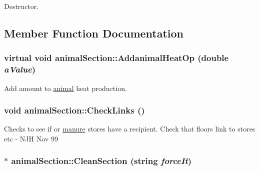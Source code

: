 Destructor. 

\subsection{Member Function Documentation}
\hypertarget{classanimal_section_a725e52db97d2127b775e259cc21e954e}{
\subsubsection[{AddanimalHeatOp}]{\setlength{\rightskip}{0pt plus 5cm}virtual void animalSection::AddanimalHeatOp (double {\em aValue})}}
\label{classanimal_section_a725e52db97d2127b775e259cc21e954e}


Add amount to \hyperlink{classanimal}{animal} heat production. \hypertarget{classanimal_section_a4d179a53e1e930f22e3038edbc8087df}{
\subsubsection[{CheckLinks}]{\setlength{\rightskip}{0pt plus 5cm}void animalSection::CheckLinks ()}}
\label{classanimal_section_a4d179a53e1e930f22e3038edbc8087df}


Checks to see if or \hyperlink{classmanure}{manure} stores have a recipient. Check that floors link to stores etc -\/ NJH Nov 99 \hypertarget{classanimal_section_a0e933a3e74bf07c42c444dd7dec4747e}{
\subsubsection[{CleanSection}]{ $\ast$ animalSection::CleanSection (string {\em forceIt})}}
\label{classanimal_section_a0e933a3e74bf07c42c444dd7dec4747e}


